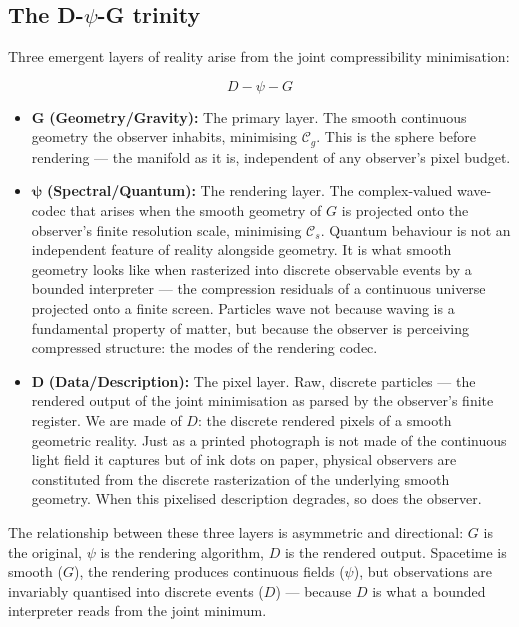\documentclass[12pt,a4paper]{article}
\newcommand{\Cs}{\mathcal{C}_s}
\newcommand{\Cg}{\mathcal{C}_g}
\begin{document}
\subsection*{The D-$\psi$-G trinity}

Three emergent layers of reality arise from the joint compressibility
minimisation:

\begin{equation}
D - \psi - G
\end{equation}

\begin{itemize}
  \item $\mathbf{G}$ \textbf{(Geometry/Gravity):} The primary layer. The
        smooth continuous geometry the observer inhabits, minimising $\Cg$.
        This is the sphere before rendering --- the manifold as it is,
        independent of any observer's pixel budget.
  \item $\boldsymbol{\psi}$ \textbf{(Spectral/Quantum):} The rendering layer.
        The complex-valued wave-codec that arises when the smooth geometry of
        $G$ is projected onto the observer's finite resolution scale,
        minimising $\Cs$. Quantum behaviour is not an independent feature of
        reality alongside geometry. It is what smooth geometry looks like when
        rasterized into discrete observable events by a bounded interpreter ---
        the compression residuals of a continuous universe projected onto a
        finite screen. Particles wave not because waving is a fundamental
        property of matter, but because the observer is perceiving compressed
        structure: the modes of the rendering codec.
  \item $\mathbf{D}$ \textbf{(Data/Description):} The pixel layer. Raw,
        discrete particles --- the rendered output of the joint minimisation
        as parsed by the observer's finite register. We are made of $D$: the
        discrete rendered pixels of a smooth geometric reality. Just as a
        printed photograph is not made of the continuous light field it
        captures but of ink dots on paper, physical observers are constituted
        from the discrete rasterization of the underlying smooth geometry.
        When this pixelised description degrades, so does the observer.
\end{itemize}

The relationship between these three layers is asymmetric and directional:
$G$ is the original, $\psi$ is the rendering algorithm, $D$ is the rendered
output. Spacetime is smooth ($G$), the rendering produces continuous fields
($\psi$), but observations are invariably quantised into discrete events ($D$)
--- because $D$ is what a bounded interpreter reads from the joint minimum.
\end{document}
